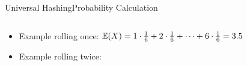 \begin{frame}{Universal Hashing}{Probability Calculation}
\begin{columns}
\begin{column}{0.5\linewidth}
\begin{table}[!h]
   \end{table}
   \end{column}
 \end{columns}
 \begin{itemize}
 \vspace*{-1.0em}
 \item<4-> Example rolling once: 
  {\color{Mittel-Blau}$\mathbb{E}(X) = 1 \cdot \frac{1}{6} + 2 \cdot \frac{1}{6}
    + \dots + 6 \cdot \frac{1}{6} = 3.5$}
 \item<6-> Example rolling twice: 
   \end{itemize}
\end{frame}





